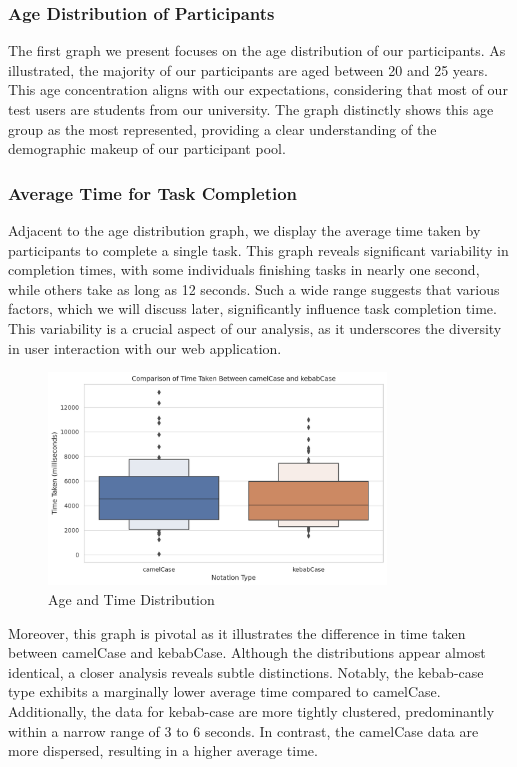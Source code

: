 \documentclass{article}
\begin{document}
\subsubsection*{Age Distribution of Participants}
The first graph we present focuses on the age distribution of our participants. As illustrated, the majority of our participants are aged between 20 and 25 years. This age concentration aligns with our expectations, considering that most of our test users are students from our university. The graph distinctly shows this age group as the most represented, providing a clear understanding of the demographic makeup of our participant pool.

\subsubsection*{Average Time for Task Completion}
Adjacent to the age distribution graph, we display the average time taken by participants to complete a single task. This graph reveals significant variability in completion times, with some individuals finishing tasks in nearly one second, while others take as long as 12 seconds. Such a wide range suggests that various factors, which we will discuss later, significantly influence task completion time. This variability is a crucial aspect of our analysis, as it underscores the diversity in user interaction with our web application.

\begin{figure}[H]
    \centering
    \includegraphics[width=0.8\textwidth]{difference_type.png}
    \caption{Age and Time Distribution}
\end{figure}

Moreover, this graph is pivotal as it illustrates the difference in time taken between camelCase and kebabCase. Although the distributions appear almost identical, a closer analysis reveals subtle distinctions. Notably, the kebab-case type exhibits a marginally lower average time compared to camelCase. Additionally, the data for kebab-case are more tightly clustered, predominantly within a narrow range of 3 to 6 seconds. In contrast, the camelCase data are more dispersed, resulting in a higher average time.
\end{document}
